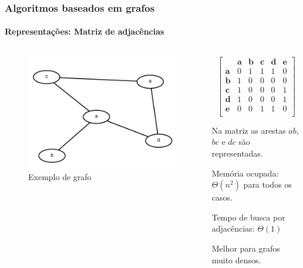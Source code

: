 \begin{frame}
	\frametitle{Algoritmos baseados em grafos}
	\framesubtitle{Representações: Matriz de adjacências}
	\begin{columns}
		\begin{column}{0.4\textwidth}
		\begin{figure}
			\centering
			\includegraphics[width=\linewidth]{images/listasDeAdjacenciasGrafo}
			\caption{Exemplo de grafo}
			\label{fig:listasdeadjacenciasgrafo2}
		\end{figure}
		\end{column}
		\begin{column}{0.6\textwidth}
			\begin{equation}
				\left[
				\begin{matrix}
					& \mathbf{a}&\mathbf{b}&\mathbf{c}&\mathbf{d}&\mathbf{e} \\
					\mathbf{a}& 0&1&1&1&0 \\
					\mathbf{b}& 1&0&0&0&0 \\
					\mathbf{c}& 1&0&0&0&1 \\
					\mathbf{d}& 1&0&0&0&1 \\
					\mathbf{e}& 0&0&1&1&0 \\
				\end{matrix}
				\right]
			\end{equation}
			
			\par Na matriz as arestas $ab$, $bc$ e $dc$ são representadas.\newline
			\par Memória ocupada: $\Theta(n^2)$ para todos os casos.
			\par Tempo de busca por adjacências: $\Theta(1)$
			\par Melhor para grafos muito densos.
		\end{column}
	\end{columns}
\end{frame}

